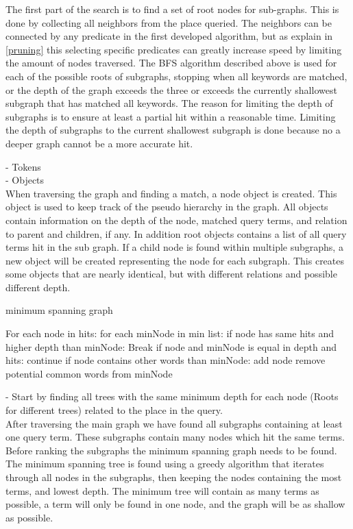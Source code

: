 The first part of the search is to find a set of root nodes for sub-graphs. This is done by collecting all neighbors from the place queried. The neighbors can be connected by any predicate in the first developed algorithm, but as explain in \ref{pruning} this selecting specific predicates can greatly increase speed by limiting the amount of nodes traversed. The BFS algorithm described above is used for each of the possible roots of subgraphs, stopping when all keywords are matched, or the depth of the graph exceeds the three or exceeds the currently shallowest subgraph that has matched all keywords. The reason for limiting the depth of subgraphs is to ensure at least a partial hit within a reasonable time. Limiting the depth of subgraphs to the current shallowest subgraph is done because no a deeper graph cannot be a more accurate hit.

- Tokens\\
- Objects\\
When traversing the graph and finding a match, a node object is created. This object is used to keep track of the pseudo hierarchy in the graph. All objects contain information on the depth of the node, matched query terms, and relation to parent and children, if any. In addition root objects contains a list of all query terms hit in the sub graph. If a child node is found within multiple subgraphs, a new object will be created representing the node for each subgraph. This creates some objects that are nearly identical, but with different relations and possible different depth.\\

\begin{algorithm}
\caption{minimum spanning graph}
\begin{algorithmic}[1]
For each node in hits:
	for each minNode in min list:
		if node has same hits and higher depth than minNode:
			Break
		if node and minNode is equal in depth and hits:
			continue
		if node contains other words than minNode:
			add node
			remove potential common words from minNode
\EndProcedure
\end{algorithmic}
\end{algorithm}


- Start by finding all trees with the same  minimum depth for each node (Roots for different trees) related to the place in the query.\\
After traversing the main graph we have found all subgraphs containing at least one query term. These subgraphs contain many nodes which hit the same terms. Before ranking the subgraphs the minimum spanning graph needs to be found. The minimum spanning tree is found using a greedy algorithm that iterates through all nodes in the subgraphs, then keeping the nodes containing the most terms, and lowest depth. The minimum tree will contain as many terms as possible, a term will only be found in one node, and the graph will be as shallow as possible.\\

